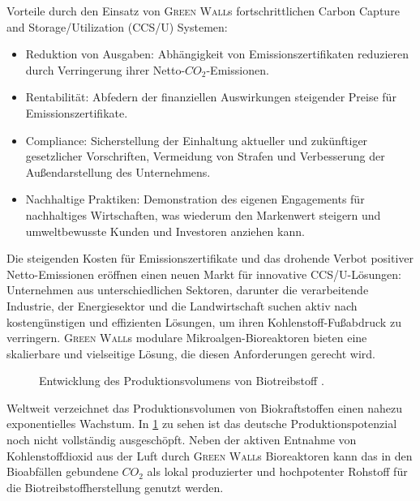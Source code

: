 Vorteile durch den Einsatz von \textsc{Green Wall}s fortschrittlichen Carbon Capture and Storage/Utilization (CCS/U) Systemen:

\begin{itemize}
    \item Reduktion von Ausgaben: Abhängigkeit von Emissionszertifikaten reduzieren durch Verringerung ihrer Netto-\(CO_2\)-Emissionen.
    \item Rentabilität: Abfedern der finanziellen Auswirkungen steigender Preise für Emissionszertifikate.
    \item Compliance: Sicherstellung der Einhaltung aktueller und zukünftiger gesetzlicher Vorschriften, Vermeidung von Strafen und Verbesserung der Außendarstellung des Unternehmens.
    \item Nachhaltige Praktiken: Demonstration des eigenen Engagements für nachhaltiges Wirtschaften, was wiederum den Markenwert steigern und umweltbewusste Kunden und Investoren anziehen kann.
\end{itemize}

Die steigenden Kosten für Emissionszertifikate und das drohende Verbot positiver Netto-Emissionen eröffnen einen neuen Markt für innovative CCS/U-Lösungen: Unternehmen aus unterschiedlichen Sektoren, darunter die verarbeitende Industrie, der Energiesektor und die Landwirtschaft suchen aktiv nach kostengünstigen und effizienten Lösungen, um ihren Kohlenstoff-Fußabdruck zu verringern.
\textsc{Green Wall}s modulare Mikroalgen-Bioreaktoren bieten eine skalierbare und vielseitige Lösung, die diesen Anforderungen gerecht wird.\par\medskip

\begin{figure}[h]
    \centering
    
    \caption[Entwicklung des Produktionsvolumens von Biotreibstoff]{Entwicklung des Produktionsvolumens von Biotreibstoff \cite{Statista2024.Biof.DE,Statista2024.Biof.EU,Statista2024.Biof.WW}.}\label{fig:biofuel production}
\end{figure}

Weltweit verzeichnet das Produktionsvolumen von Biokraftstoffen einen nahezu exponentielles Wachstum.
In \cref{fig:biofuel production} zu sehen ist das deutsche Produktionspotenzial noch nicht vollständig ausgeschöpft.
Neben der aktiven Entnahme von Kohlenstoffdioxid aus der Luft durch \textsc{Green Wall}s Bioreaktoren kann das in den Bioabfällen gebundene \(CO_2\) als lokal produzierter und hochpotenter Rohstoff für die Biotreibstoffherstellung genutzt werden.


